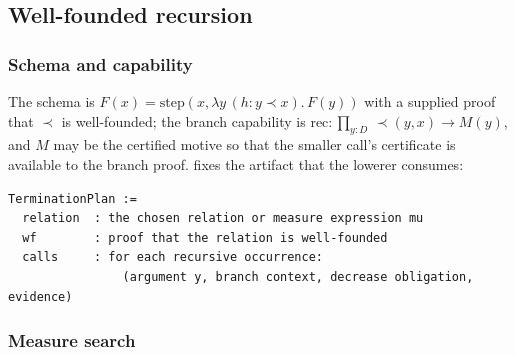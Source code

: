 \subsection{Well-founded recursion}\label{alg:rec-wf}

\subsubsection{Schema and capability}

The schema is $F(x) = \mathrm{step}(x, \lambda y\,(h : y \prec x).\,F(y))$ with a supplied proof that $\prec$ is well-founded; the branch capability is $\mathrm{rec} : \prod_{y:D}\,\prec(y,x) \to M(y)$, and $M$ may be the certified motive so that the smaller call's certificate is available to the branch proof.  fixes the artifact that the lowerer consumes:
\begin{lstlisting}
TerminationPlan :=
  relation  : the chosen relation or measure expression mu
  wf        : proof that the relation is well-founded
  calls     : for each recursive occurrence:
                (argument y, branch context, decrease obligation, evidence)
\end{lstlisting}

\subsubsection{Measure search}

